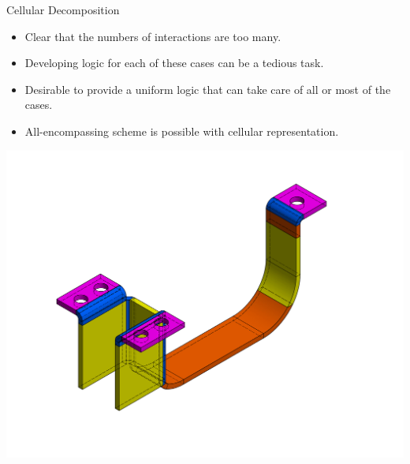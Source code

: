 \begin{frame}{Cellular Decomposition}
\begin{itemize}[noitemsep,label=\textbullet,topsep=2pt,parsep=2pt,partopsep=2pt]
\item Clear that the numbers of interactions are too many. 
\item Developing logic for each of these cases can be a tedious task. 
\item Desirable to provide a uniform logic that can take care of all or most of the cases. 
\item All-encompassing scheme is possible with cellular representation.
\end{itemize}
\begin{center}
\includegraphics[width=0.55\linewidth]{../Common/images/VolDecomp1.pdf}
\end{center}
\end{frame}

